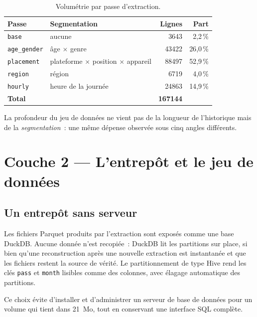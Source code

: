 \documentclass[11pt,a4paper]{article}
\newcommand{\code}[1]{\texttt{\small #1}}
\begin{document}
\begin{table}[h]
\centering
\small
\begin{tabular}{@{}llrr@{}}
\toprule
\textbf{Passe} & \textbf{Segmentation} & \textbf{Lignes} & \textbf{Part} \\
\midrule
\code{base}       & aucune                                & \num{3643}  & 2{,}2\,\% \\
\code{age\_gender} & âge $\times$ genre                    & \num{43422} & 26{,}0\,\% \\
\code{placement}  & plateforme $\times$ position $\times$ appareil & \num{88497} & 52{,}9\,\% \\
\code{region}     & région                                & \num{6719}  & 4{,}0\,\% \\
\code{hourly}     & heure de la journée                   & \num{24863} & 14{,}9\,\% \\
\midrule
\textbf{Total}    &                                       & \textbf{\num{167144}} & \\
\bottomrule
\end{tabular}
\caption{Volumétrie par passe d'extraction.}
\end{table}

La profondeur du jeu de données ne vient pas de la longueur de l'historique
mais de la \emph{segmentation}~: une même dépense observée sous cinq angles
différents.

\section{Couche 2 --- L'entrepôt et le jeu de données}

\subsection{Un entrepôt sans serveur}

Les fichiers Parquet produits par l'extraction sont exposés comme une base
DuckDB. Aucune donnée n'est recopiée~: DuckDB lit les partitions sur place, si
bien qu'une reconstruction après une nouvelle extraction est instantanée et que
les fichiers restent la source de vérité. Le partitionnement de type Hive rend
les clés \code{pass} et \code{month} lisibles comme des colonnes, avec élagage
automatique des partitions.

Ce choix évite d'installer et d'administrer un serveur de base de données pour
un volume qui tient dans 21~Mo, tout en conservant une interface SQL complète.
\end{document}
